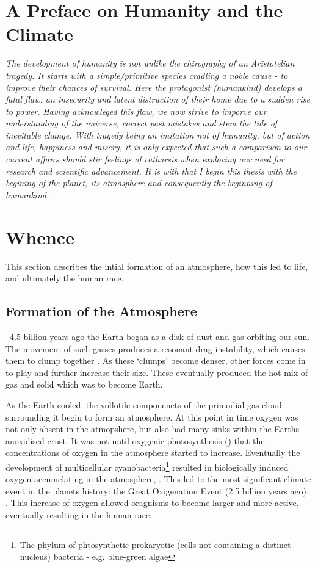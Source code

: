 

\section*{A Preface on Humanity and the Climate}
\begin{flushleft}\emph{
The development of humanity is not unlike the chirography of an Aristotelian tragedy. It starts with a simple/primitive species cradling a noble cause - to improve their chances of survival. Here the protagonist (humankind) develops a fatal flaw: an insecurity and latent distruction of their home due to a sudden rise to power.
Having acknowleged this flaw, we now strive to imporve our understanding of the universe, correct past mistakes and stem the tide of inevitable change. \vspace{\baselineskip}\linebreak
With tragedy being an imitation not of humanity, but of action and life, happiness and misery, it is only expected that such a comparison to our current affairs should stir feelings of catharsis when exploring our need for research and scientific advancement.
It is with that I begin this thesis with the begining of the planet, its atmosphere and consequently the beginning of humankind.
}
\end{flushleft}

\section{Whence}
This section describes the intial formation of an atmosphere, how this led to life, and ultimately the human race.


\subsection{Formation of the Atmosphere}
 ~4.5 billion years ago the Earth began as a disk of dust and gas orbiting our sun. The movement of such gasses produces a resonant drag instability, which causes them to clump together \citep{drag,planet}. As these `clumps' become denser, other forces come in to play and further increase their size. These eventually produced the hot mix of gas and solid which was to become Earth.

 As the Earth cooled, the vollotile componenets of the primodial gas cloud surrounding it begin to form an atmosphere. %
At this point in time oxygen was not only absent in the atmopshere, but also had many sinks within the Earths anoxidised crust. It was not until oxygenic photosynthesis (\citep{oxygenicphotosynthesis}) that the concentrations of oxygen in the atmosphere started to increase. Eventually the development of multicellular cyanobacteria\footnote{The phylum of phtosynthetic prokaryotic (cells not containing a distinct nucleus) bacteria - e.g. blue-green algae} resulted in biologically induced oxygen accumelating in the atmosphere, \citep{multicellular}. This led to the most significant climate event in the planets history: the Great Oxigenation Event (2.5 billion years ago), \citep{oxidation}. This increase of oxygen allowed oragnisms to become larger and more active, eventually resulting in the human race.

